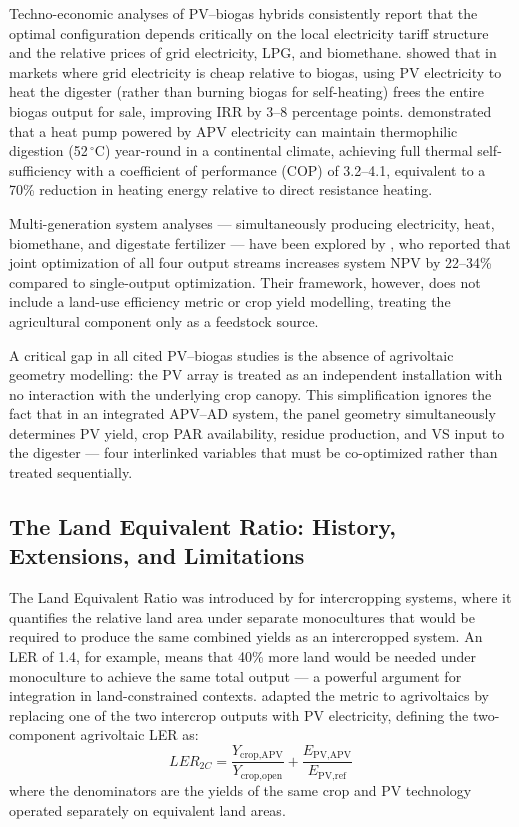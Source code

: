 Techno-economic analyses of PV--biogas hybrids consistently report
that the optimal configuration depends critically on the local
electricity tariff structure and the relative prices of grid
electricity, LPG, and biomethane. \citet{pal2024} showed that in
markets where grid electricity is cheap relative to biogas, using PV
electricity to heat the digester (rather than burning biogas for
self-heating) frees the entire biogas output for sale, improving IRR
by 3--8 percentage points. \citet{temiz2024} demonstrated that a
heat pump powered by APV electricity can maintain thermophilic
digestion (52\,$^{\circ}$C) year-round in a continental climate,
achieving full thermal self-sufficiency with a coefficient of
performance (COP) of 3.2--4.1, equivalent to a 70\% reduction in
heating energy relative to direct resistance heating.

Multi-generation system analyses --- simultaneously producing
electricity, heat, biomethane, and digestate fertilizer --- have
been explored by \citet{roldanporta2023}, who reported that joint
optimization of all four output streams increases system NPV by
22--34\% compared to single-output optimization. Their framework,
however, does not include a land-use efficiency metric or crop yield
modelling, treating the agricultural component only as a feedstock
source.

A critical gap in all cited PV--biogas studies is the absence of
agrivoltaic geometry modelling: the PV array is treated as an
independent installation with no interaction with the underlying
crop canopy. This simplification ignores the fact that in an
integrated APV--AD system, the panel geometry simultaneously
determines PV yield, crop PAR availability, residue production,
and VS input to the digester --- four interlinked variables that
must be co-optimized rather than treated sequentially.

\subsection{The Land Equivalent Ratio: History, Extensions,
and Limitations}

\hspace{1cm}The Land Equivalent Ratio was introduced by
\citet{mead1980} for intercropping systems, where it quantifies
the relative land area under separate monocultures that would be
required to produce the same combined yields as an intercropped
system. An LER of 1.4, for example, means that 40\% more land
would be needed under monoculture to achieve the same total
output --- a powerful argument for integration in land-constrained
contexts. \citet{dupraz2011} adapted the metric to agrivoltaics
by replacing one of the two intercrop outputs with PV electricity,
defining the two-component agrivoltaic LER as:
\[
    LER_{2C} = \frac{Y_{\text{crop,APV}}}{Y_{\text{crop,open}}}
             + \frac{E_{\text{PV,APV}}}{E_{\text{PV,ref}}}
\]
where the denominators are the yields of the same crop and PV
technology operated separately on equivalent land areas.

